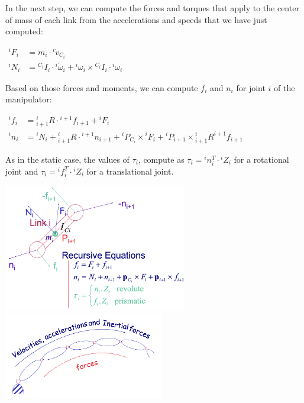 In the next step, we can compute the forces and torques that apply to the center of mass of each link from the accelerations and speeds that we have just computed:

\begin{center}
$\begin{aligned}
{ }^{i} F_{i} &=m_i \cdot{ }^{i} \dot{v}_{C_{i}} \\
{ }^{i} N_{i} &={ }^{C_{i}} I_{i} \cdot{ }^{i} \dot{\omega}_{i}+{ }^{i} \omega_{i} \times{ }^{C_{i}} I_{i} \cdot{ }^{i} \omega_{i}
\end{aligned}$
\end{center}

Based on those forces and moments, we can compute $f_i$ and $n_i$ for joint $i$ of the manipulator:

\begin{center}
	$\begin{aligned}
		{ }^{i} f_{i} &={ }_{i+1}^{i} R \cdot{ }^{i+1} f_{i+1}+{ }^{i} F_{i} \\
		{ }^{i} n_{i} &={ }^{i} N_{i}+{ }_{i+1}^{i} R \cdot{ }^{i+1} n_{i+1}+{ }^{i} P_{C_{i}} \times{ }^{i} F_{i}+{ }^{i} P_{i+1} \times{ }_{i+1}^{i} R^{i+1} f_{i+1}
	\end{aligned}$
\end{center}

As in the static case, the values of $\tau_i$, compute as $\tau_i = {}^in^T_i \cdot {}^iZ_i$ for a rotational joint and $\tau_i = {}^if^T_i \cdot {}^iZ_i$ for a translational joint.

\begin{center}
	\includegraphics[width=8cm]{sections/imgs/6_newton_euler_recursive_eq.png}
	\hfill
	\includegraphics[width=7cm]{sections/imgs/6_newton_euler_alg.png}
\end{center}

